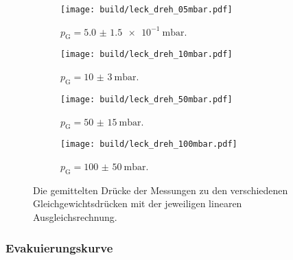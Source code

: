     \begin{figure}[h]
      \begin{subfigure}{0.48\textwidth}
        \centering
        \texttt{[image: build/leck\_dreh\_05mbar.pdf]}
        \caption{$p_\text{G} = \SI{5.0(15)e-1}{\milli\bar}$.}
        \label{fig:dreh_leck_05}
      \end{subfigure}
      \hfill
      \begin{subfigure}{0.48\textwidth}
        \centering
        \texttt{[image: build/leck\_dreh\_10mbar.pdf]}
        \caption{$p_\text{G} = \SI{10(3)}{\milli\bar}$.}
        \label{fig:dreh_leck_10}
      \end{subfigure}
      \hfill
      \begin{subfigure}{0.48\textwidth}
        \centering
        \texttt{[image: build/leck\_dreh\_50mbar.pdf]}
        \caption{$p_\text{G} = \SI{50(15)}{\milli\bar}$.}
        \label{fig:dreh_leck_50}
      \end{subfigure}
      \hfill
      \begin{subfigure}{0.48\textwidth}
        \centering
        \texttt{[image: build/leck\_dreh\_100mbar.pdf]}
        \caption{$p_\text{G} = \SI{100(50)}{\milli\bar}$.}
        \label{fig:dreh_leck_100}
      \end{subfigure}
      \caption{Die gemittelten Drücke der Messungen zu den verschiedenen Gleichgewichtsdrücken mit der jeweiligen linearen Ausgleichsrechnung.}
      \label{fig:dreh_leck}
    \end{figure}

  \subsubsection{Evakuierungskurve}

